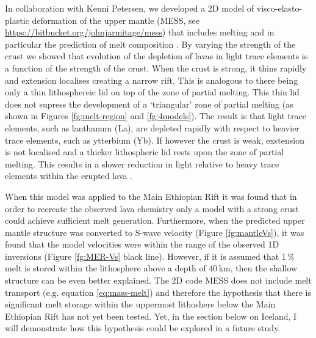 In collaboration with Kenni Petersen, we developed a 2D model of visco-elasto-plastic deformation of the upper mantle (MESS, see \url{https://bitbucket.org/johnjarmitage/mess}) that includes melting and in particular the prediction of melt composition \citep{petersen-etal-2015,armitage-etal-g3-2018}. By varying the strength of the crust we showed that evolution of the depletion of lavas in light trace elements is a function of the strength of the crust. When the crust is strong, it thins rapidly and extension localises creating a narrow rift. This is analogous to there being only a thin lithosphereic lid on top of the zone of partial melting. This thin lid does not supress the development of a `triangular' zone of partial melting (as shown in Figures \ref{fg:melt-region} and \ref{fg:4models}). The result is that light trace elements, such as lanthanum (La), are depleted rapidly with respect to heavier trace elements, such as ytterbium (Yb). If however the crust is weak, exstension is not localised and a thicker lithospheric lid rests upon the zone of partial melting. This results in a slower reduction in light relative to heavy trace elements within the erupted lava \citep{armitage-etal-g3-2018}.

When this model was applied to the Main Ethiopian Rift it was found that in order to recreate the observed lava chemistry only a model with a strong crust could achieve sufficient melt generation. Furthermore, when the predicted upper mantle structure was converted to S-wave velocity (Figure \ref{fg:mantleVs}), it was found that the model velocities were within the range of the observed 1D inversions (Figure \ref{fg:MER-Vs} black line). However, if it is assumed that 1\,\% melt is stored within the lithosphere above a depth of 40\,km, then the shallow structure can be even better explained. The 2D code MESS does not include melt transport (e.g. equation \ref{eq:mass-melt}) and therefore the hypothesis that there is significant melt storage within the uppermost lithoshere below the Main Ethiopian Rift has not yet been tested. Yet, in the section below on Iceland, I will demonstrate how this hypothesis could be explored in a future study.

